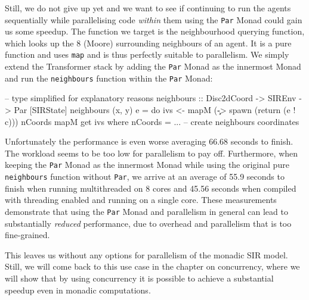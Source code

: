 Still, we do not give up yet and we want to see if continuing to run the agents sequentially while parallelising code \textit{within} them using the \texttt{Par} Monad could gain us some speedup. The function we target is the neighbourhood querying function, which looks up the 8 (Moore) surrounding neighbours of an agent. It is a pure function and uses \texttt{map} and is thus perfectly suitable to parallelism. We simply extend the Transformer stack by adding the \texttt{Par} Monad as the innermost Monad and run the \texttt{neighbours} function within the \texttt{Par} Monad:

\begin{HaskellCode}
-- type simplified for explanatory reasons
neighbours :: Disc2dCoord -> SIREnv -> Par [SIRState]
neighbours (x, y) e = do
    ivs <- mapM (\c -> spawn (return (e ! c))) nCoords
    mapM get ivs
  where
    nCoords = ... -- create neighbours coordinates
\end{HaskellCode}

Unfortunately the performance is even worse averaging 66.68 seconds to finish. The workload seems to be too low for parallelism to pay off. Furthermore, when keeping the \texttt{Par} Monad as the innermost Monad while using the original pure \texttt{neighbours} function without \texttt{Par}, we arrive at an average of 55.9 seconds to finish when running multithreaded on 8 cores and 45.56 seconds when compiled with threading enabled and running on a single core. These measurements demonstrate that using the \texttt{Par} Monad and parallelism in general can lead to substantially \textit{reduced} performance, due to overhead and parallelism that is too fine-grained.

This leaves us without any options for parallelism of the monadic SIR model. Still, we will come back to this use case in the chapter on concurrency, where we will show that by using concurrency it is possible to achieve a substantial speedup even in monadic computations.
